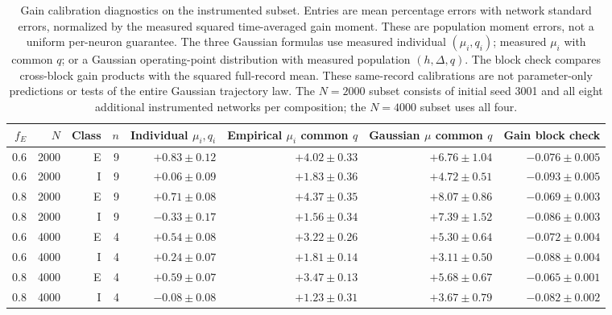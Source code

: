 \begin{table}[htp]
\centering
\footnotesize
\caption{Gain calibration diagnostics on the instrumented subset. Entries are
mean percentage errors with network standard errors, normalized by the
measured squared time-averaged gain moment. These are population moment
errors, not a uniform per-neuron guarantee. The three Gaussian formulas use
measured individual $(\mu_i,q_i)$; measured $\mu_i$ with common $q$; or a
Gaussian operating-point distribution with measured population $(h,\Delta,q)$.
The block check compares cross-block gain products with the squared full-record
mean. These same-record calibrations are not parameter-only predictions or
tests of the entire Gaussian trajectory law. The $N=2000$ subset consists of
initial seed 3001 and all eight additional instrumented networks per
composition; the $N=4000$ subset uses all four.}
\label{tab:gain_calibration}
\begin{tabular}{rrrrrrrr}
\toprule
$f_E$&$N$&Class&$n$&\shortstack{Individual\\$\mu_i,q_i$}&\shortstack{Empirical $\mu_i$\\common $q$}&\shortstack{Gaussian $\mu$\\common $q$}&Gain block check\\
\midrule
0.6&2000&E&9&$+0.83\pm0.12$&$+4.02\pm0.33$&$+6.76\pm1.04$&$-0.076\pm0.005$\\
0.6&2000&I&9&$+0.06\pm0.09$&$+1.83\pm0.36$&$+4.72\pm0.51$&$-0.093\pm0.005$\\
0.8&2000&E&9&$+0.71\pm0.08$&$+4.37\pm0.35$&$+8.07\pm0.86$&$-0.069\pm0.003$\\
0.8&2000&I&9&$-0.33\pm0.17$&$+1.56\pm0.34$&$+7.39\pm1.52$&$-0.086\pm0.003$\\
0.6&4000&E&4&$+0.54\pm0.08$&$+3.22\pm0.26$&$+5.30\pm0.64$&$-0.072\pm0.004$\\
0.6&4000&I&4&$+0.24\pm0.07$&$+1.81\pm0.14$&$+3.11\pm0.50$&$-0.088\pm0.004$\\
0.8&4000&E&4&$+0.59\pm0.07$&$+3.47\pm0.13$&$+5.68\pm0.67$&$-0.065\pm0.001$\\
0.8&4000&I&4&$-0.08\pm0.08$&$+1.23\pm0.31$&$+3.67\pm0.79$&$-0.082\pm0.002$\\
\bottomrule
\end{tabular}
\end{table}
